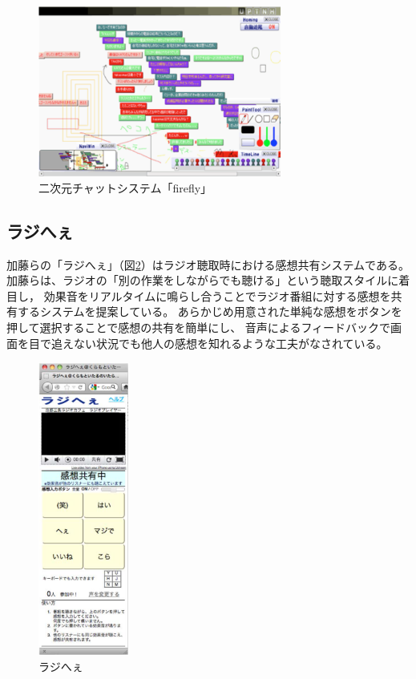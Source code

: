 \begin{figure}[H]
\centering
\includegraphics[width=8cm]{images/2dchat.png}
\caption{二次元チャットシステム「firefly」}
\label{2dchat}
\end{figure}


\subsection{ラジへぇ}

加藤らの「ラジへぇ\cite{110009657336}」（図\ref{rajihe}）はラジオ聴取時における感想共有システムである。
加藤らは、ラジオの「別の作業をしながらでも聴ける」という聴取スタイルに着目し，
効果音をリアルタイムに鳴らし合うことでラジオ番組に対する感想を共有するシステムを提案している。
あらかじめ用意された単純な感想をボタンを押して選択することで感想の共有を簡単にし、
音声によるフィードバックで画面を目で追えない状況でも他人の感想を知れるような工夫がなされている。

\begin{figure}[H]
\centering
\includegraphics[width=3cm]{images/rajihe.png}
\caption{ラジへぇ}
\label{rajihe}
\end{figure}


